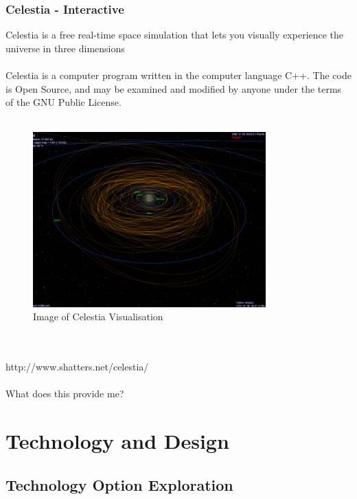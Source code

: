 \documentclass[11pt
              , a4paper
              , twoside
              , openright
              ]{report}
\begin{document}
\subsection{Celestia - Interactive}
Celestia is a free real-time space simulation that lets you visually experience the universe in three dimensions
\\\\
Celestia is a computer program written in the computer language C++.  The code is Open Source, and may be examined and modified by anyone under the terms of the GNU Public License.
\\\\
\begin{figure}[h!]
  \centering
      \includegraphics[width=0.8\textwidth]{images/celestia.jpg}
  \caption{Image of Celestia Visualisation}
\end{figure}
\\\\
http://www.shatters.net/celestia/
\\\\
What does this provide me?

\chapter{Technology and Design}
\section{Technology Option Exploration}
\end{document}
